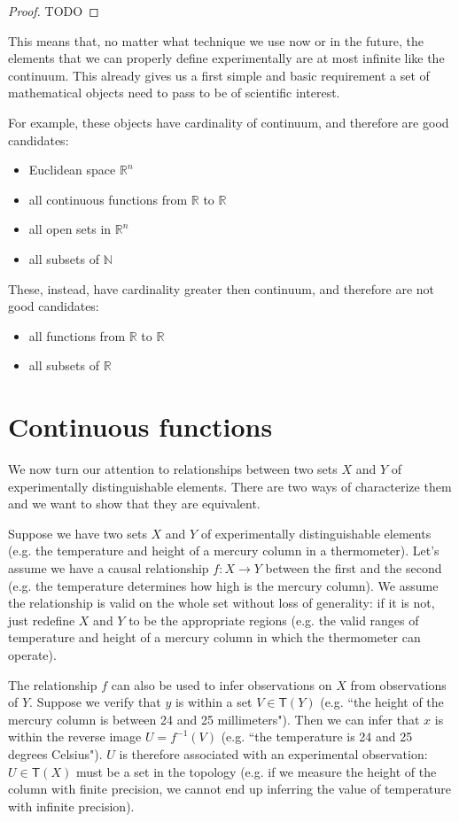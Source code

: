 \documentclass[11pt,letterpaper,fleqn]{memoir} %
\begin{document}
\begin{proof}
	TODO
\end{proof}

This means that, no matter what technique we use now or in the future, the elements that we can properly define experimentally are at most infinite like the continuum. This already gives us a first simple and basic requirement a set of mathematical objects need to pass to be of scientific interest.

For example, these objects have cardinality of continuum, and therefore are good candidates:
\begin{itemize}
	\item Euclidean space $\mathbb{R}^n$
	\item all continuous functions from $\mathbb{R}$ to $\mathbb{R}$
	\item all open sets in $\mathbb{R}^n$
	\item all subsets of $\mathbb{N}$
\end{itemize}

These, instead, have cardinality greater then continuum, and therefore are not good candidates:
\begin{itemize}
	\item all functions from $\mathbb{R}$ to $\mathbb{R}$
	\item all subsets of $\mathbb{R}$
\end{itemize}


\section{Continuous functions}

We now turn our attention to relationships between two sets $X$ and $Y$ of experimentally distinguishable elements. There are two ways of characterize them and we want to show that they are equivalent.

Suppose we have two sets $X$ and $Y$ of experimentally distinguishable elements (e.g. the temperature and height of a mercury column in a thermometer). Let's assume we have a causal relationship $f: X \rightarrow Y$ between the first and the second (e.g. the temperature determines how high is the mercury column). We assume the relationship is valid on the whole set without loss of generality: if it is not, just redefine $X$ and $Y$ to be the appropriate regions (e.g. the valid ranges of temperature and height of a mercury column in which the thermometer can operate).

The relationship $f$ can also be used to infer observations on $X$ from observations of $Y$. Suppose we verify that $y$ is within a set $V \in \mathsf{T}(Y)$ (e.g. ``the height of the mercury column is between 24 and 25 millimeters"). Then we can infer that $x$ is within the reverse image $U=f^{-1}(V)$ (e.g. ``the temperature is 24 and 25 degrees Celsius"). $U$ is therefore associated with an experimental observation: $U \in \mathsf{T}(X)$ must be a set in the topology (e.g. if we measure the height of the column with finite precision, we cannot end up inferring the value of temperature with infinite precision).
\end{document}
